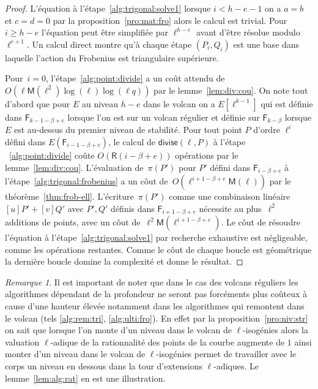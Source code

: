 \documentclass[10pt,a4paper]{book}
\theoremstyle{plain}
\theoremstyle{definition}
\theoremstyle{definition}
\theoremstyle{definition}
\theoremstyle{definition}
\theoremstyle{remark}
\newtheorem{rem}[thm]{Remarque}
\theoremstyle{remark}
\theoremstyle{definition}
\begin{document}
\begin{proof}
L'équation à l'étape~\ref{alg:trigonal:solve1} lorsque $i<h-e-1$ on a $a=b$ et 
$c=d=0$ par la proposition~\ref{pro:mat:fro} alors le calcul est trivial. Pour 
$i \geqslant h-e$ l'équation peut être simplifiée par  $\ell^{h-e}$ avant 
d'être résolue modulo $\ell^{e+1}$. Un calcul direct montre qu'à chaque étape 
$(P_i,Q_i)$ est une base dans laquelle l'action du Frobenius est triangulaire 
supérieure. 


Pour~$i = 0$, l'étape~\ref{alg:point:divide} a
 un coût attendu de $O(\ell \mathsf{M}(\ell^2)\log(\ell)\log(\ell q))$
par le lemme~\ref{lem:div:cou}.
  On note tout d'abord que pour $E$ au niveau $h-e$ dans le volcan on a 
  $E[\ell^{k-1}]$ qui est définie dans $\mathsf{F}_{k-1-\beta+e}$ lorsque l'on
 est sur un volcan régulier et définie sur $\mathsf{F}_{k-\beta}$ lorsque 
 $E$ est au-dessus du premier niveau de stabilité. Pour tout point $P$ d'ordre
 $\ell^i$ défini dans 
 $E(\mathsf{F}_{i-1-\beta+e})$, le calcul de $\mathsf{divise}(\ell, P)$ à 
 l'étape ~\ref{alg:point:divide} coûte $O(\mathsf{R}(i-\beta+e))$ opérations 
 par le lemme~\ref{lem:div:cou}.
  L'évaluation de~$\pi(P')$ pour $P'$ défini dans $\mathsf{F}_{i-\beta+e}$ à
   l'étape~\ref{alg:trigonal:frobenius} a un côut
  de~$O(\ell^{i+1-\beta+e}\mathsf{M}(\ell))$ par le théorème~\ref{thm:frob-ell}.
  L'écriture~$\pi(P')$ comme une combinaison linéaire~$[u] P' + [v] Q'$ avec 
  $P',Q'$ définis dans $\mathsf{F}_{i+1-\beta+e}$ nécessite au
  plus~$\ell^2$ additions de points, avec un côut de~$\ell^2
  \mathsf{M}(\ell^{i+1-\beta+e})$.
  Le côut de résoudre l'équation à l'étape~\ref{alg:trigonal:solve1}
  par recherche exhaustive est négligeable, comme les 
  opérations restantes. Comme le côut de chaque boucle est géométrique
  la dernière boucle domine la complexité et donne le résultat.
\end{proof}

\begin{rem}
Il est important de noter que dans le cas des volcans réguliers les algorithmes
dépendant de la profondeur  ne seront pas forcéments plus coûteux à cause d'une 
hauteur élevée notamment dans les algorithmes qui remontent dans le volcan 
(tels \ref{alg:rem:tri}, \ref{alg:ulti:fro}). En effet par la 
proposition~\ref{pro:niv:str} on sait que lorsque l'on monte d'un niveau dans
le volcan de $\ell$-isogénies alors la valuation $\ell$-adique de la 
rationnalité des points de la courbe augmente de $1$ ainsi monter d'un niveau 
dans le volcan de $\ell$-isogénies permet de travailler avec le corps un niveau
en dessous dans la tour d'extensions $\ell$-adiques. Le lemme~\ref{lem:alg:rat}
en est une illustration.
\end{rem}
\end{document}
